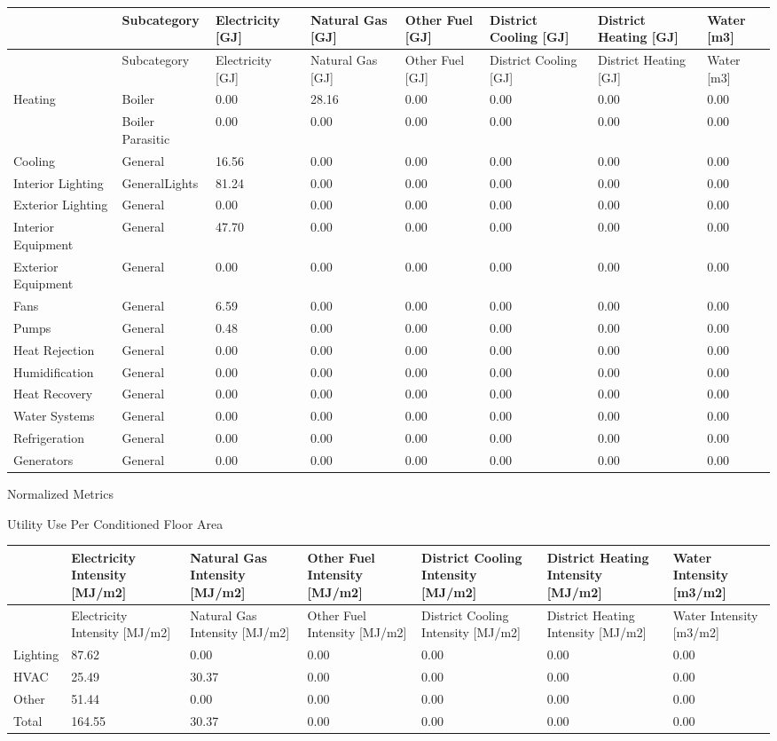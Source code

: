 \begin{longtable}[c]{p{0.75in}p{0.75in}p{0.75in}p{0.75in}p{0.75in}p{0.75in}p{0.75in}p{0.75in}}
\toprule 
~ & Subcategory & Electricity [GJ] & Natural Gas [GJ] & Other Fuel [GJ] & District Cooling [GJ] & District Heating [GJ] & Water [m3] \tabularnewline
\midrule
\endfirsthead

\toprule 
~ & Subcategory & Electricity [GJ] & Natural Gas [GJ] & Other Fuel [GJ] & District Cooling [GJ] & District Heating [GJ] & Water [m3] \tabularnewline
\midrule
\endhead

Heating & Boiler & 0.00 & 28.16 & 0.00 & 0.00 & 0.00 & 0.00 \tabularnewline
~ & Boiler Parasitic & 0.00 & 0.00 & 0.00 & 0.00 & 0.00 & 0.00 \tabularnewline
Cooling & General & 16.56 & 0.00 & 0.00 & 0.00 & 0.00 & 0.00 \tabularnewline
Interior Lighting & GeneralLights & 81.24 & 0.00 & 0.00 & 0.00 & 0.00 & 0.00 \tabularnewline
Exterior Lighting & General & 0.00 & 0.00 & 0.00 & 0.00 & 0.00 & 0.00 \tabularnewline
Interior Equipment & General & 47.70 & 0.00 & 0.00 & 0.00 & 0.00 & 0.00 \tabularnewline
Exterior Equipment & General & 0.00 & 0.00 & 0.00 & 0.00 & 0.00 & 0.00 \tabularnewline
Fans & General & 6.59 & 0.00 & 0.00 & 0.00 & 0.00 & 0.00 \tabularnewline
Pumps & General & 0.48 & 0.00 & 0.00 & 0.00 & 0.00 & 0.00 \tabularnewline
Heat Rejection & General & 0.00 & 0.00 & 0.00 & 0.00 & 0.00 & 0.00 \tabularnewline
Humidification & General & 0.00 & 0.00 & 0.00 & 0.00 & 0.00 & 0.00 \tabularnewline
Heat Recovery & General & 0.00 & 0.00 & 0.00 & 0.00 & 0.00 & 0.00 \tabularnewline
Water Systems & General & 0.00 & 0.00 & 0.00 & 0.00 & 0.00 & 0.00 \tabularnewline
Refrigeration & General & 0.00 & 0.00 & 0.00 & 0.00 & 0.00 & 0.00 \tabularnewline
Generators & General & 0.00 & 0.00 & 0.00 & 0.00 & 0.00 & 0.00 \tabularnewline
\bottomrule
\end{longtable}

Normalized Metrics

Utility Use Per Conditioned Floor Area

\begin{longtable}[c]{p{0.85in}p{0.85in}p{0.85in}p{0.85in}p{0.85in}p{0.85in}p{0.85in}}
\toprule 
~ & Electricity Intensity [MJ/m2] & Natural Gas Intensity [MJ/m2] & Other Fuel Intensity [MJ/m2] & District Cooling Intensity [MJ/m2] & District Heating Intensity [MJ/m2] & Water Intensity [m3/m2] \tabularnewline
\midrule
\endfirsthead

\toprule 
~ & Electricity Intensity [MJ/m2] & Natural Gas Intensity [MJ/m2] & Other Fuel Intensity [MJ/m2] & District Cooling Intensity [MJ/m2] & District Heating Intensity [MJ/m2] & Water Intensity [m3/m2] \tabularnewline
\midrule
\endhead

Lighting & 87.62 & 0.00 & 0.00 & 0.00 & 0.00 & 0.00 \tabularnewline
HVAC & 25.49 & 30.37 & 0.00 & 0.00 & 0.00 & 0.00 \tabularnewline
Other & 51.44 & 0.00 & 0.00 & 0.00 & 0.00 & 0.00 \tabularnewline
Total & 164.55 & 30.37 & 0.00 & 0.00 & 0.00 & 0.00 \tabularnewline
\bottomrule
\end{longtable}

